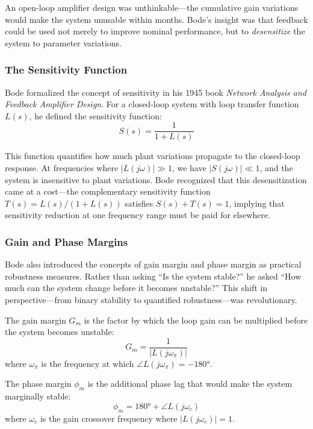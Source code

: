 An open-loop amplifier design was unthinkable---the cumulative gain variations would make the system unusable within months. Bode's insight was that feedback could be used not merely to improve nominal performance, but to \textit{desensitize} the system to parameter variations.

\subsubsection{The Sensitivity Function}

Bode formalized the concept of sensitivity in his 1945 book \textit{Network Analysis and Feedback Amplifier Design}. For a closed-loop system with loop transfer function $L(s)$, he defined the sensitivity function:
\begin{equation}
S(s) = \frac{1}{1 + L(s)}
\label{eq:sensitivity_bode}
\end{equation}

This function quantifies how much plant variations propagate to the closed-loop response. At frequencies where $|L(j\omega)| \gg 1$, we have $|S(j\omega)| \ll 1$, and the system is insensitive to plant variations. Bode recognized that this desensitization came at a cost---the complementary sensitivity function $T(s) = L(s)/(1+L(s))$ satisfies $S(s) + T(s) = 1$, implying that sensitivity reduction at one frequency range must be paid for elsewhere.

\subsubsection{Gain and Phase Margins}

Bode also introduced the concepts of gain margin and phase margin as practical robustness measures. Rather than asking ``Is the system stable?'' he asked ``How much can the system change before it becomes unstable?'' This shift in perspective---from binary stability to quantified robustness---was revolutionary.

\begin{definition}
The gain margin $G_m$ is the factor by which the loop gain can be multiplied before the system becomes unstable:
\begin{equation}
G_m = \frac{1}{|L(j\omega_\pi)|}
\label{eq:gain_margin}
\end{equation}
where $\omega_\pi$ is the frequency at which $\angle L(j\omega_\pi) = -180°$.
\end{definition}

\begin{definition}
The phase margin $\phi_m$ is the additional phase lag that would make the system marginally stable:
\begin{equation}
\phi_m = 180° + \angle L(j\omega_c)
\label{eq:phase_margin}
\end{equation}
where $\omega_c$ is the gain crossover frequency where $|L(j\omega_c)| = 1$.
\end{definition}

